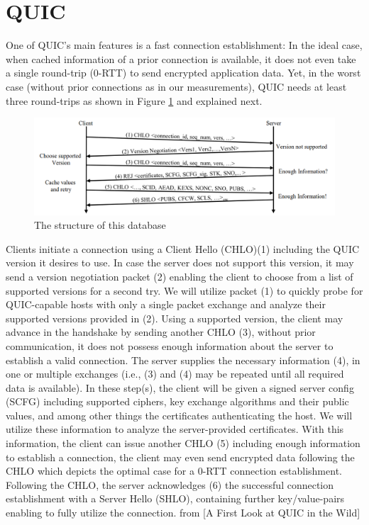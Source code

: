 \documentclass[a4paper, 10pt]{article}
\begin{document}
\section{QUIC}

One of QUIC’s main features is a fast connection establishment: In the ideal case,  when cached information of a prior connection is available, it does not even take a single  round-trip (0-RTT) to send encrypted application data. Yet, in the worst case (without  prior connections as in our measurements), QUIC needs at least three round-trips as  shown in Figure \ref{fig:quic1} and explained next.


\begin{figure}[ht]
	\centering
	\begin{minipage}{0.8\textwidth}%
		\includegraphics[width=500pt]{quic1.png}
		\caption{The structure of this database}
		\label{fig:quic1}
	\end{minipage}
\end{figure}

Clients initiate a connection using a Client Hello (CHLO)(1) including the QUIC  version it desires to use. In case the server does not support this version, it may send  a version negotiation packet (2) enabling the client to choose from a list of supported  versions for a second try. We will utilize packet (1) to quickly probe for QUIC-capable  hosts with only a single packet exchange and analyze their supported versions provided  in (2). Using a supported version, the client may advance in the handshake by sending  another CHLO (3), without prior communication, it does not possess enough information  about the server to establish a valid connection. The server supplies the necessary  information (4), in one or multiple exchanges (i.e., (3) and (4) may be repeated until all  required data is available). In these step(s), the client will be given a signed server config  (SCFG) including supported ciphers, key exchange algorithms and their public values,  and among other things the certificates authenticating the host. We will utilize these  information to analyze the server-provided certificates. With this information, the client  can issue another CHLO (5) including enough information to establish a connection, the  client may even send encrypted data following the CHLO which depicts the optimal case  for a 0-RTT connection establishment. Following the CHLO, the server acknowledges (6)  the successful connection establishment with a Server Hello (SHLO), containing further  key/value-pairs enabling to fully utilize the connection. from [A First Look at QUIC in the Wild]
\end{document}
